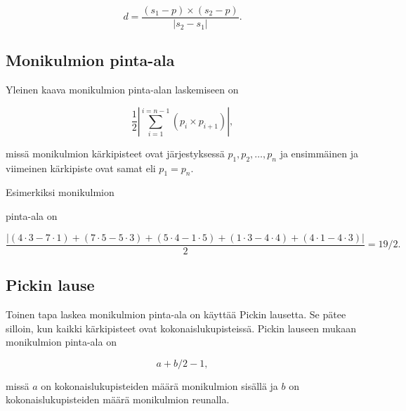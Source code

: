 \[ d = \frac{(s_1-p) \times (s_2-p)}{|s_2-s_1|} .\]


\subsection{Monikulmion pinta-ala}

Yleinen kaava monikulmion pinta-alan laskemiseen on

\[\frac{1}{2} |\sum_{i=1}^{i=n-1} (p_i \times p_{i+1})|, \]

missä monikulmion kärkipisteet ovat
järjestyksessä $p_1,p_2,\ldots,p_n$
ja ensimmäinen ja viimeinen kärkipiste
ovat samat eli $p_1=p_n$.

Esimerkiksi monikulmion
\begin{center}
\end{center}

pinta-ala on

\[\frac{|(4\cdot3-7\cdot1)+(7\cdot5-5\cdot3)+(5\cdot4-1\cdot5)+(1\cdot3-4\cdot4)+(4\cdot1-4\cdot3)|}{2} = 19/2.\]

\subsection{Pickin lause}

Toinen tapa laskea monikulmion pinta-ala
on käyttää Pickin lausetta.
Se pätee silloin, kun kaikki kärkipisteet ovat
kokonaislukupisteissä.
Pickin lauseen mukaan monikulmion pinta-ala on

\[ a + b/2 -1, \]

missä $a$ on kokonaislukupisteiden määrä monikulmion sisällä
ja $b$ on kokonaislukupisteiden määrä monikulmion reunalla.

